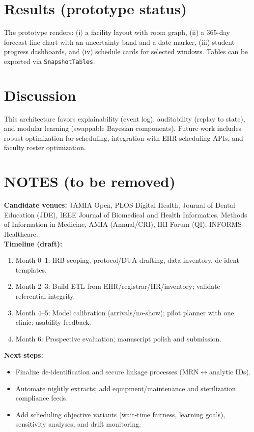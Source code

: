 \documentclass[Afour,sageh,times]{sagej}
\begin{document}
\section{Results (prototype status)}
The prototype renders: (i) a facility layout with room graph, (ii) a 365-day forecast line chart with an uncertainty band and a date marker, (iii) student progress dashboards, and (iv) schedule cards for selected windows. Tables can be exported via \texttt{SnapshotTables}.

\section{Discussion}
This architecture favors explainability (event log), auditability (replay to state), and modular learning (swappable Bayesian components). Future work includes robust optimization for scheduling, integration with EHR scheduling APIs, and faculty roster optimization.

\section*{NOTES (to be removed)}
\textbf{Candidate venues:} JAMIA Open, PLOS Digital Health, Journal of Dental Education (JDE), IEEE Journal of Biomedical and Health Informatics, Methods of Information in Medicine, AMIA (Annual/CRI), IHI Forum (QI), INFORMS Healthcare. \\
\textbf{Timeline (draft):}
\begin{enumerate}[leftmargin=*,itemsep=2pt]
  \item Month 0--1: IRB scoping, protocol/DUA drafting, data inventory, de-ident templates.
  \item Month 2--3: Build ETL from EHR/registrar/HR/inventory; validate referential integrity.
  \item Month 4--5: Model calibration (arrivals/no-show); pilot planner with one clinic; usability feedback.
  \item Month 6: Prospective evaluation; manuscript polish and submission.
\end{enumerate}
\textbf{Next steps:}
\begin{itemize}[leftmargin=*,itemsep=2pt]
  \item Finalize de-identification and secure linkage processes (MRN$\leftrightarrow$analytic IDs).
  \item Automate nightly extracts; add equipment/maintenance and sterilization compliance feeds.
  \item Add scheduling objective variants (wait-time fairness, learning goals), sensitivity analyses, and drift monitoring.
\end{itemize}
\end{document}
